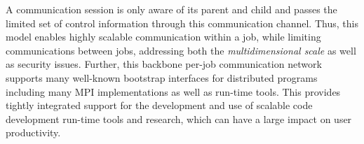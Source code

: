 A communication session is only aware of its parent 
and child and passes the limited set of control information 
through this communication channel. Thus, this model 
enables highly scalable communication within a job, while 
limiting communications between jobs, addressing 
both the {\em multidimensional scale} as well as security issues.
Further, this backbone per-job communication network 
supports many well-known bootstrap interfaces 
for distributed programs including many MPI implementations 
as well as run-time tools.  This provides tightly integrated support
for the development and use of scalable code development run-time tools
and research, which can have a large impact on user productivity.
